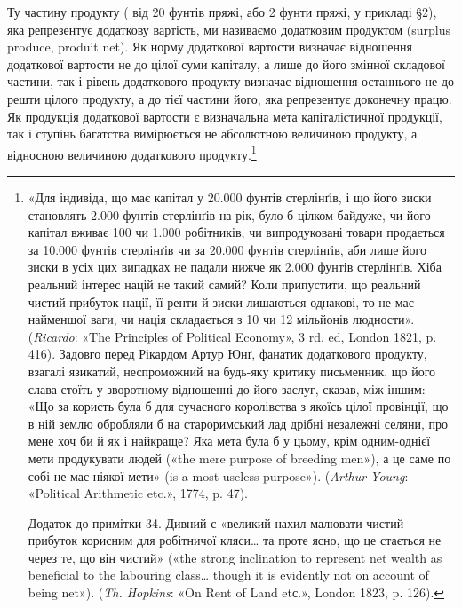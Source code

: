 Ту частину продукту ( від 20 фунтів пряжі, або 2 фунти пряжі, у
прикладі §2), яка репрезентує додаткову вартість, ми
називаємо додатковим продуктом (surplus produce, produit net). Як норму
додаткової вартости визначає відношення додаткової
вартости не до цілої суми капіталу, а лише до його змінної складової частини,
так і рівень додаткового продукту визначає відношення останнього не до решти
цілого продукту, а до тієї частини його, яка репрезентує доконечну працю.
Як продукція додаткової вартости є визначальна мета
капіталістичної продукції, так і ступінь багатства вимірюється не абсолютною
величиною продукту, а відносною величиною додаткового продукту.\footnote{
«Для індивіда, що має капітал у 20.000 фунтів стерлінґів, і що його зиски
становлять 2.000 фунтів стерлінґів на рік, було б цілком байдуже, чи його
капітал вживає 100 чи 1.000 робітників, чи випродуковані товари продається
за 10.000 фунтів стерлінґів чи за 20.000 фунтів стерлінґів, аби лише
його зиски в усіх цих випадках не падали нижче як 2.000 фунтів
стерлінґів. Хіба реальний інтерес націй не такий самий? Коли припустити, що
реальний чистий прибуток нації, її ренти й зиски лишаються однакові, то не має
найменшої ваги, чи нація складається з 10 чи
12 мільйонів людности». (\emph{Ricardo}: «The Principles of Political Economy»,
3 rd. ed, London 1821, p. 416). Задовго перед Рікардом Артур Юнґ, фанатик
додаткового продукту, взагалі язикатий, неспроможний
на будь-яку критику письменник, що його слава стоїть у зворотному відношенні
до його заслуг, сказав, між іншим: «Що за користь була б для сучасного
королівства з якоїсь цілої провінції, що в ній землю обробляли б на
староримський лад дрібні незалежні селяни, про мене хоч би
й як і найкраще? Яка мета була б у цьому, крім одним-однієї мети продукувати
людей («the mere purpose of breeding men»), а це саме по собі не має
ніякої мети» (is a most useless purpose»). (\emph{Arthur Young}: «Political
Arithmetic etc.», 1774, p. 47).

Додаток до примітки 34. Дивний є «великий нахил малювати чистий прибуток
корисним для робітничої кляси\dots{} та проте ясно, що це стається не через те,
що він чистий» («the strong inclination to
represent net wealth as beneficial to the labouring class\dots{} though it
is evidently not on account
of being net»). (\emph{Th. Hopkins}: «On Rent of Land etс.», London 1823, p. 126).
}

